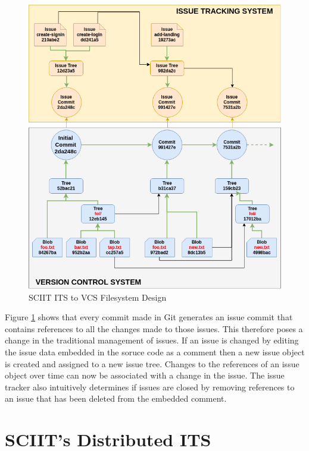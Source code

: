 \documentclass{mproj}
\begin{document}
\begin{figure}[t]
\caption{SCIIT ITS to VCS Filesystem Design}
\label{fig:sciit-filesystem}
\centering
\includegraphics[width=12cm]{sciit-filesystem}
\end{figure}

Figure \ref{fig:sciit-filesystem} shows that every commit made in Git generates an issue commit that contains references to all the changes made to those issues. This therefore poses a change in the traditional management of issues. If an issue is changed by editing the issue data embedded in the soruce code as a comment then a new issue object is created and assigned to a new issue tree. Changes to the references of an issue object over time can now be associated with a change in the issue. The issue tracker also intuitively determines if issues are closed by removing references to an issue that has been deleted from the embedded comment.









\section{SCIIT's Distributed ITS}
\end{document}
